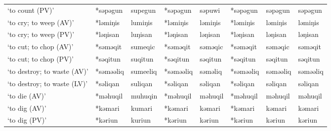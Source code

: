\begin{landscape}
\begin{longtable}[c]{@{}p{3cm}<{\raggedright}p{2.75cm}<{\raggedright}p{2.75cm}<{\raggedright}p{2.75cm}<{\raggedright}p{2.75cm}<{\raggedright}p{2.75cm}<{\raggedright}p{2.75cm}<{\raggedright}p{2.75cm}<{\raggedright}@{}}
`to count (PV)'                                      & *səpəgun           & supegun                        & *səpəgun           & səpuwi                     & *səpəgun         & səpəgun                  & səpəgun                           \\
`to cry; to weep (AV)'                               & *ləmiŋis           & lumiŋis                        & *ləmiŋis           & ləmiŋis                    & *ləmiŋis         & ləmiŋis                  & ləmiŋis                           \\
`to cry; to weep (PV)'                               & *ləŋisan           & luŋisan                        & *ləŋisan           & ləŋisan                    & *ləŋisan         & ləŋisan                  & ləŋisan                           \\
`to cut; to chop (AV)'                               & *səməqit           & sumeqic                        & *səməqit           & səməqic                    & *səməqit         & səməqic                  & səməqit                           \\
`to cut; to chop (PV)'                               & *səqitun           & suqitun                        & *səqitun           & səqitun                    & *səqitun         & səqitun                  & səqitun                           \\
`to destroy; to waste (AV)'                          & *səməəliq          & sumeeliq                       & *səməəliq          & səməliq                    & *səməəliq        & səməəliq                 & səməəliq                          \\
`to destroy; to waste (LV)'                          & *səliqan           & suliqan                        & *səliqan           & səliqan                    & *səliqan         & səliqan                  & səliqan                           \\
`to die (AV)'                                        & *məhuqil           & muhuqin                        & *məhuqil           & məhuqil                    & *məhuqil         & məhuqil                  & məhuqil                           \\
`to dig (AV)'                                        & *kəmari            & kumari                         & *kəmari            & kəmari                     & *kəmari          & kəmari                   & kəmari                            \\
`to dig (PV)'                                        & *kəriun            & kuriun                         & *kəriun            & kəriun                     & *kəriun          & kəriun                   & kəriun                            \\

\end{longtable}
\end{landscape}
